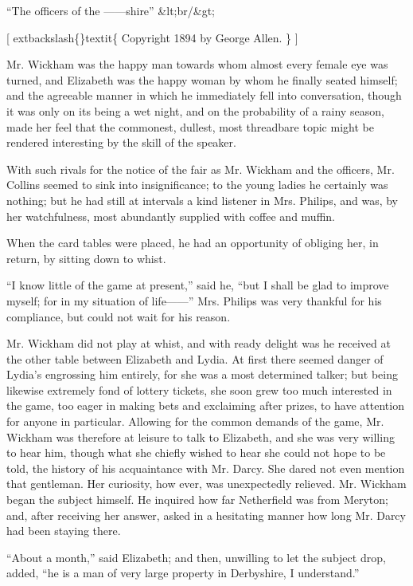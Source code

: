 \documentclass[10pt]{book}
\begin{document}
     “The officers of the ——shire”
     &lt;br/&gt;

     [
     	extbackslash\{\}textit\{
      Copyright 1894 by George Allen.
     \}
     ]
    

   Mr. Wickham was the happy man towards whom almost every female eye was
turned, and Elizabeth was
   the happy woman by whom he finally seated
himself; and the agreeable manner in which he immediately fell into
conversation, though it was only on its being a wet night, and on the
probability of a rainy season, made her feel that the commonest,
dullest, most threadbare topic might be rendered interesting by the
skill of the speaker.
  

   With such rivals for the notice of the fair as Mr. Wickham and the
officers, Mr. Collins seemed to sink into insignificance; to the young
ladies he certainly was nothing; but he had still at intervals a kind
listener in Mrs. Philips, and was, by her watchfulness, most abundantly
supplied with coffee and muffin.
  

   When the card tables were placed, he had an opportunity of obliging her,
in return, by sitting down to whist.
  

   “I know little of the game at present,” said he, “but I shall be glad to
improve myself; for in my situation of life——” Mrs. Philips was very
thankful for his compliance, but could not wait for his reason.
  

   Mr. Wickham did not play at whist, and with ready delight was he
received at the other table between Elizabeth and Lydia. At first there
seemed danger of Lydia’s engrossing him entirely, for she was a most
determined talker; but being likewise extremely fond of lottery tickets,
she soon grew too much interested in the game, too eager in making bets
and exclaiming after prizes, to have attention for anyone in particular.
Allowing for the common demands of the game, Mr. Wickham was therefore
at leisure to talk to Elizabeth, and she was very willing to hear him,
though what she chiefly wished to hear she could not hope to be told,
the history of his acquaintance with Mr. Darcy. She dared not even
mention that gentleman. Her curiosity, how
   ever, was unexpectedly
relieved. Mr. Wickham began the subject himself. He inquired how far
Netherfield was from Meryton; and, after receiving her answer, asked in
a hesitating manner how long Mr. Darcy had been staying there.
  

   “About a month,” said Elizabeth; and then, unwilling to let the subject
drop, added, “he is a man of very large property in Derbyshire, I
understand.”
  
\end{document}
